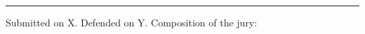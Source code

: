 {\begin{center}
{\begin{large}
        \vspace{0.2cm}
        \rule{0.2\textwidth}{0.6pt}

    \end{large}
    }
\end{center}

\begin{small}
    
\noindent Submitted on X. Defended on Y.
\vfill
\noindent Composition of the jury:

%
\end{small}


}

\makeatother